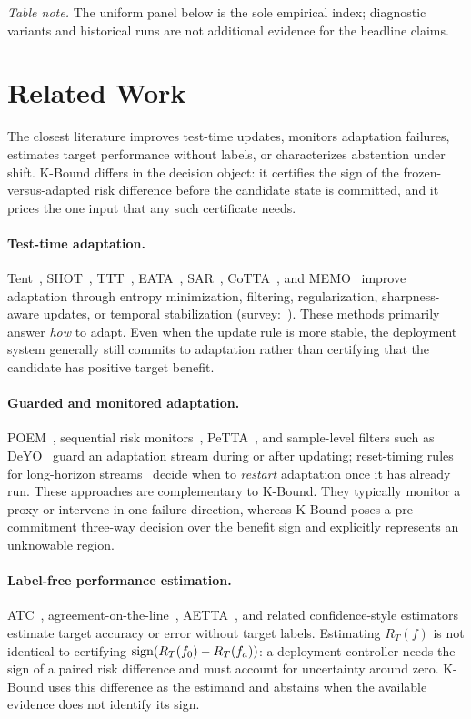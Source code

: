 \noindent\emph{Table note.} The uniform panel below is the sole empirical index; diagnostic variants
and historical runs are not additional evidence for the headline claims.



\section{Related Work}\label{sec:related}
The closest literature improves test-time updates, monitors adaptation failures, estimates target
performance without labels, or characterizes abstention under shift. K-Bound differs in the decision
object: it certifies the sign of the frozen-versus-adapted risk difference before the candidate state
is committed, and it prices the one input that any such certificate needs.

\paragraph{Test-time adaptation.} Tent~\cite{wang2021tent}, SHOT~\cite{liang2020shot}, TTT~\cite{sun2020ttt}, EATA~\cite{niu2022eata}, SAR~\cite{niu2023sar}, CoTTA~\cite{wang2022cotta}, and MEMO~\cite{zhang2022memo} improve adaptation through entropy minimization, filtering, regularization, sharpness-aware updates, or temporal stabilization (survey:~\cite{liang2025ttasurvey}). These methods primarily answer \emph{how} to adapt. Even when the update rule is more stable, the deployment system generally still commits to adaptation rather than certifying that the candidate has positive target benefit.

\paragraph{Guarded and monitored adaptation.} POEM~\cite{bar2024poem}, sequential risk monitors~\cite{schirmer2025monitoring,podkopaev2022tracking}, PeTTA~\cite{hoang2024petta}, and sample-level filters such as DeYO~\cite{lee2024deyo} guard an adaptation stream during or after updating; reset-timing rules for long-horizon streams~\cite{lim2026reset} decide when to \emph{restart} adaptation once it has already run. These approaches are complementary to K-Bound. They typically monitor a proxy or intervene in one failure direction, whereas K-Bound poses a pre-commitment three-way decision over the benefit sign and explicitly represents an unknowable region.

\paragraph{Label-free performance estimation.} ATC~\cite{garg2022atc}, agreement-on-the-line~\cite{baek2022aol,miller2021aol}, AETTA~\cite{lee2024aetta}, and related confidence-style estimators~\cite{deng2023confidence,xie2024mano} estimate target accuracy or error without target labels. Estimating $R_T(f)$ is not identical to certifying $\operatorname{sign}(R_T(f_0)-R_T(f_a))$: a deployment controller needs the sign of a paired risk difference and must account for uncertainty around zero. K-Bound uses this difference as the estimand and abstains when the available evidence does not identify its sign.

